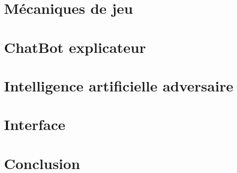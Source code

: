 \documentclass[a4paper, 11pt]{article}
\begin{document}
\newpage

\section{Mécaniques de jeu}

\newpage

\section{ChatBot explicateur}

\newpage

\section{Intelligence artificielle adversaire}

\newpage

\section{Interface}

\newpage

\section{Conclusion}
\end{document}
